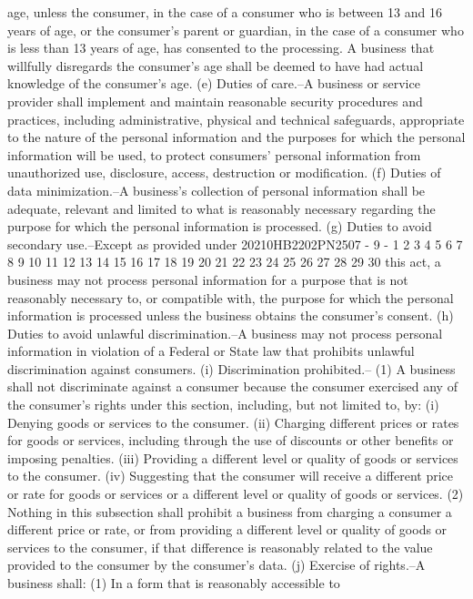 age, unless the consumer, in the case of a consumer who is
between 13 and 16 years of age, or the consumer's parent or
guardian, in the case of a consumer who is less than 13 years of
age, has consented to the processing. A business that willfully
disregards the consumer's age shall be deemed to have had actual
knowledge of the consumer's age.
(e) Duties of care.--A business or service provider shall
implement and maintain reasonable security procedures and
practices, including administrative, physical and technical
safeguards, appropriate to the nature of the personal
information and the purposes for which the personal information
will be used, to protect consumers' personal information from
unauthorized use, disclosure, access, destruction or
modification.
(f) Duties of data minimization.--A business's collection of
personal information shall be adequate, relevant and limited to
what is reasonably necessary regarding the purpose for which the
personal information is processed.
(g) Duties to avoid secondary use.--Except as provided under
20210HB2202PN2507 - 9 -
1
2
3
4
5
6
7
8
9
10
11
12
13
14
15
16
17
18
19
20
21
22
23
24
25
26
27
28
29
30
this act, a business may not process personal information for a
purpose that is not reasonably necessary to, or compatible with,
the purpose for which the personal information is processed
unless the business obtains the consumer's consent.
(h) Duties to avoid unlawful discrimination.--A business may
not process personal information in violation of a Federal or
State law that prohibits unlawful discrimination against
consumers.
(i) Discrimination prohibited.--
(1) A business shall not discriminate against a consumer
because the consumer exercised any of the consumer's rights
under this section, including, but not limited to, by:
(i) Denying goods or services to the consumer.
(ii) Charging different prices or rates for goods or
services, including through the use of discounts or other
benefits or imposing penalties.
(iii) Providing a different level or quality of
goods or services to the consumer.
(iv) Suggesting that the consumer will receive a
different price or rate for goods or services or a
different level or quality of goods or services.
(2) Nothing in this subsection shall prohibit a business
from charging a consumer a different price or rate, or from
providing a different level or quality of goods or services
to the consumer, if that difference is reasonably related to
the value provided to the consumer by the consumer's data.
(j) Exercise of rights.--A business shall:
(1) In a form that is reasonably accessible to
